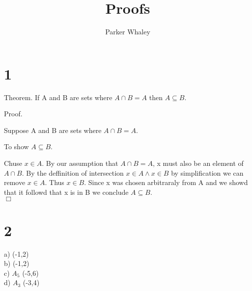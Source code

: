 \documentclass[11pt,a4paper]{article}
\author{Parker Whaley}
\title{Proofs}
\begin{document}
\maketitle

\section{1}
Theorem. If A and B are sets where $A\cap B=A$ then $A \subseteq B$.

Proof.

Suppose A and B are sets where $A\cap B=A$.

To show $A \subseteq B$.

Chuse $x\in A$.  By our assumption that $A\cap B=A$, x must also be an element of $A\cap B$.  By the deffinition of intersection $x\in A\wedge x\in B$ by simplification we can remove $x\in A$.  Thus $x\in B$.  Since x was chosen arbitraraly from A and we showd that it followd that x is in B we conclude $A\subseteq B$.\\$\Box$

\section{2}

a)  (-1,2)\\

b)  (-1,2)\\

c)  $A_5$ (-5,6)\\

d)  $A_3$ (-3,4)\\
\end{document}
